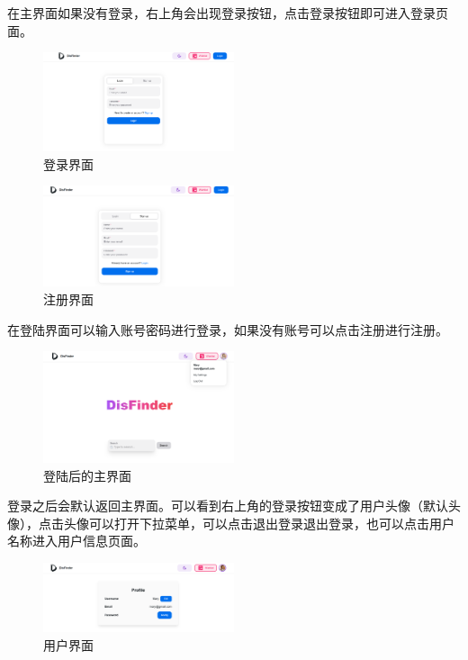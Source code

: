 在主界面如果没有登录，右上角会出现登录按钮，点击登录按钮即可进入登录页面。

\begin{figure}[H]
\centering
\includegraphics[width=0.5\textwidth]{assets/report/login_page.png}
\caption{登录界面}
\end{figure}

\begin{figure}[H]
\centering
\includegraphics[width=0.5\textwidth]{assets/report/register_page.png}
\caption{注册界面}
\end{figure}

在登陆界面可以输入账号密码进行登录，如果没有账号可以点击注册进行注册。

\begin{figure}[H]
\centering
\includegraphics[width=0.5\textwidth]{assets/report/homepage_logon.png}
\caption{登陆后的主界面}
\end{figure}

登录之后会默认返回主界面。可以看到右上角的登录按钮变成了用户头像（默认头像），点击头像可以打开下拉菜单，可以点击退出登录退出登录，也可以点击用户名称进入用户信息页面。

\begin{figure}[H]
\centering
\includegraphics[width=0.5\textwidth]{assets/report/user_page.png}
\caption{用户界面}
\end{figure}

